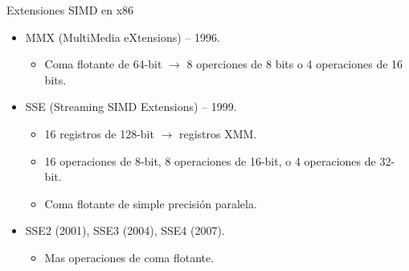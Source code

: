 \begin{frame}[t]{Extensiones SIMD en x86}
\begin{itemize}
  \item MMX (MultiMedia eXtensions) -- 1996.
    \begin{itemize}
      \item Coma flotante de 64-bit $\rightarrow$ 
            8 operciones de 8 bits o 4 operaciones de 16 bits.
    \end{itemize}

  \item SSE (Streaming SIMD Extensions) -- 1999.
    \begin{itemize}
      \item 16 registros de 128-bit $\rightarrow$ registros XMM.
      \item 16 operaciones de 8-bit, 8 operaciones de 16-bit, o 4 operaciones de 32-bit.
      \item Coma flotante de simple precisión paralela.
    \end{itemize}

  \item SSE2 (2001), SSE3 (2004), SSE4 (2007).
    \begin{itemize}
      \item Mas operaciones de coma flotante.
    \end{itemize}

\end{itemize}
\end{frame}

